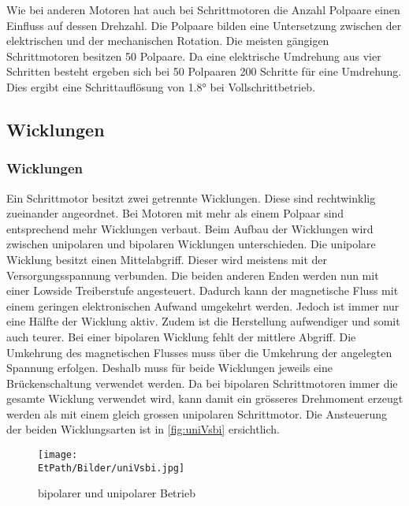     \noindent
    Wie bei anderen Motoren hat auch bei Schrittmotoren die Anzahl Polpaare 
    einen Einfluss auf dessen Drehzahl. Die Polpaare bilden eine Untersetzung 
    zwischen der elektrischen und der mechanischen Rotation. Die meisten 
    gängigen Schrittmotoren besitzen 50 Polpaare. Da eine elektrische 
    Umdrehung aus vier Schritten besteht ergeben sich bei 50 Polpaaren 200 
    Schritte für eine Umdrehung. Dies ergibt eine Schrittauflösung von 
    1.8\si{\degree} bei Vollschrittbetrieb. 

\ifSTANDALONE
    \subsection{Wicklungen} \label{sec:windings}
\fi
\ifEMBED
    \subsubsection{Wicklungen} \label{sec:windings}
\fi
    Ein Schrittmotor besitzt zwei getrennte Wicklungen. Diese sind 
    rechtwinklig zueinander angeordnet. Bei Motoren mit mehr als einem Polpaar 
    sind entsprechend mehr Wicklungen verbaut. Beim Aufbau der Wicklungen 
    wird zwischen unipolaren und bipolaren Wicklungen unterschieden. 
    Die unipolare Wicklung besitzt einen Mittelabgriff. Dieser wird meistens 
    mit der Versorgungsspannung verbunden. Die beiden anderen Enden werden nun 
    mit einer Lowside Treiberstufe angesteuert. Dadurch kann der magnetische 
    Fluss mit einem geringen elektronischen Aufwand umgekehrt werden. Jedoch 
    ist immer nur eine Hälfte der Wicklung aktiv. Zudem ist die Herstellung 
    aufwendiger und somit auch teurer. 
    Bei einer bipolaren Wicklung fehlt der mittlere Abgriff. Die Umkehrung des 
    magnetischen Flusses muss über die Umkehrung der angelegten Spannung 
    erfolgen. Deshalb muss für beide Wicklungen jeweils eine Brückenschaltung 
    verwendet werden. Da bei bipolaren Schrittmotoren immer die gesamte 
    Wicklung verwendet wird, kann damit ein grösseres Drehmoment erzeugt 
    werden als mit einem gleich grossen unipolaren Schrittmotor. 
    Die Ansteuerung der beiden Wicklungsarten ist in \autoref{fig:uniVsbi} 
    ersichtlich. \cite{Doku:Stepper}
    \begin{figure}[h!]
       	\centering
       	\texttt{[image: \\EtPath/Bilder/uniVsbi.jpg]}
       	\caption[Bipolarer und unipolarer Betrieb]{bipolarer und unipolarer Betrieb \cite{Doku:Stepper}}
       	\label{fig:uniVsbi}
    \end{figure}
    
       
    
